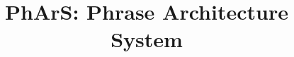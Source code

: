 \documentclass[9pt,journal,letterpaper,compsoc]{IEEEtran}
\begin{document}
\title{PhArS: Phrase Architecture System}


\maketitle
\IEEEdisplaynotcompsoctitleabstractindextext
\IEEEpeerreviewmaketitle
\thispagestyle{empty}
\pagestyle{empty}

%
%



\end{document}
